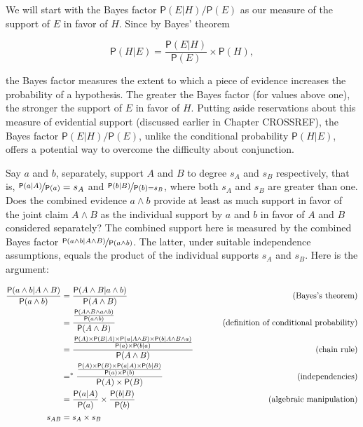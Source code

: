 \documentclass[
  10pt,
  dvipsnames,enabledeprecatedfontcommands]{scrartcl}
\newcommand{\et}{\wedge}
\newcommand{\pr}[1]{\mathsf{P}(#1)}
\begin{document}
We will start with the Bayes factor \(\pr{E \vert H}/\pr{E}\) as our
measure of the support of \(E\) in favor of \(H\). Since by Bayes'
theorem

\[\pr{H \vert E} = \frac{\pr{E \vert H}}{\pr{E}}\times \pr{H},\]

\noindent the Bayes factor measures the extent to which a piece of
evidence increases the probability of a hypothesis. The greater the
Bayes factor (for values above one), the stronger the support of \(E\)
in favor of \(H\). Putting aside reservations about this measure of
evidential support (discussed earlier in Chapter CROSSREF), the Bayes
factor \(\pr{E \vert H}/\pr{E}\), unlike the conditional probability
\(\pr{H \vert E}\), offers a potential way to overcome the difficulty
about conjunction.

Say \(a\) and \(b\), separately, support \(A\) and \(B\)
 to degree \(s_A\) and \(s_B\)
respectively, that is, \(\nicefrac{\pr{a \vert A}}{\pr{a}}=s_A\) and
\(\nicefrac{\pr{b \vert B}}{\pr{b}=s_B}\), where both \(s_A\) and
\(s_B\) are greater than one. Does the combined evidence \(a \wedge b\)
provide at least as much support in favor of the joint claim
\(A \wedge B\) as the individual support by \(a\) and \(b\) in favor of
\(A\) and \(B\) considered separately? The combined support here is
measured by the combined Bayes factor
\(\nicefrac{\pr{a \wedge b\vert A\wedge B}}{\pr{a \wedge b}}\). The
latter, under suitable independence assumptions, equals the product of
the individual supports \(s_{A}\) and \(s_{B}\). Here is the argument:

\begin{align*}
\frac{\pr{a \wedge b\vert A\wedge B}}{\pr{a \wedge b}} & =  \frac{\pr{A \et B\vert a\wedge b}}{\pr{A \et B}}
&\mbox{\,\,\,\,\,\,\,\,\,\,\,\,\, (Bayes's theorem)}
\\
& =  \frac{\frac{ \pr{A \et B \et a \wedge b }}{\pr{a \et b}}}{\pr{A \et B}} 
&\mbox{\,\,\,\,\,\,\,\,\,\,\,\,\, (definition of conditional probability)}\\ 
& =  \frac{\frac{ \pr{A} \times \pr{B|A} \times \pr{a \vert A \wedge B} \times \pr{b \vert A \wedge B \wedge a}}{\pr{a} \times \pr{b \vert a}}}{\pr{A \et B}} 
&\mbox{\,\,\,\,\,\,\,\,\,\,\,\,\, (chain rule)}
\\ 
& =^*  \frac{\frac{\pr{A} \times \pr{B} \times \pr{a \vert A} \times \pr{b \vert B}}{\pr{a} \times \pr{b}}}{\pr{A} \times \pr{B}} 
&\mbox{\,\,\,\,\,\,\,\,\,\,\,\,\, (independencies)}\\ 
& =  \frac{\pr{a |A}}{\pr{a}} \times \frac{\pr{b |B}}{\pr{b}} 
&\mbox{\,\,\,\,\,\,\,\,\,\,\,\,\, (algebraic manipulation)} \\
s_{AB}& =  s_{A}\times s_{B} 
 \end{align*}
\end{document}
